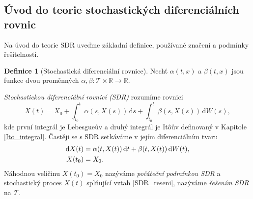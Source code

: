 \documentclass[a4paper,12pt]{report}
\theoremstyle{definition} \newtheorem{definice}[veta]{Definice}
\theoremstyle{remark}
\begin{document}
\subsection{Úvod do teorie stochastických diferenciálních rovnic}\label{SDR_kap}
Na úvod do teorie SDR uveďme základní definice, používané značení a podmínky řešitelnosti.
\begin{definice}[Stochastická diferenciální rovnice]
Nechť $\alpha(t,x)$ a $\beta(t,x)$ jsou funkce dvou proměnných $\alpha,\beta:\mathcal{T}\times\mathbb{R}\to\mathbb{R}$.

\textit{Stochastickou diferenciální rovnicí (SDR)} rozumíme rovnici
\begin{equation}\label{SDR_reseni}
X(t)=X_0+\int_{t_0}^t\alpha(s,X(s))\,\mathrm{d}s+\int_{t_0}^t\beta(s,X(s))\,\mathrm{d}W(s),
\end{equation}
kde první integrál je Lebesgueův a druhý integrál je It\^oův definovaný v Kapitole \ref{Ito_integral}.
Častěji se s SDR setkáváme v jejím diferenciálním tvaru
\begin{align}\label{SDR_def}
\mathrm{d}X(t)&=\alpha(t,X(t))\,\mathrm{d}t+\beta(t,X(t))\,\mathrm{d}W(t),\\%
X(t_0)&=X_0.\notag
\end{align}
Náhodnou veličinu $X(t_0)=X_0$ nazýváme \textit{počáteční podmínkou SDR} a stochastický proces $X(t)$ splňující vztah \eqref{SDR_reseni}, nazýváme \textit{řešením SDR} na $\mathcal{T}$.
\end{definice}
\end{document}
